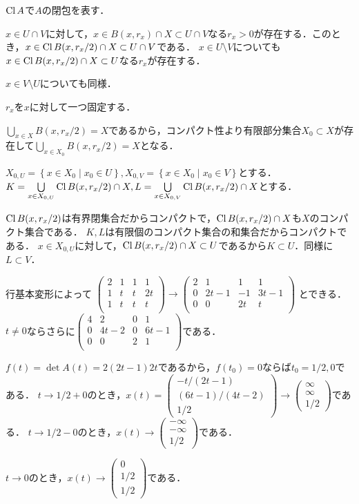 \documentclass[
		book,
		head_space=20mm,
		foot_space=20mm,
		gutter=10mm,
		line_length=190mm
]{jlreq}
\begin{document}
$\mathop{\mathrm{Cl}}{A}$で$A$の閉包を表す．

$x\in U\cap V$に対して，$x\in B(x,r_x)\cap X \subset U\cap V$なる$r_x>0$が存在する．このとき，$x\in \mathop{\mathrm{Cl}}{B(x,r_x/2)} \cap X \subset U\cap V$である．
$x\in U\setminus V$についても$x\in \mathop{\mathrm{Cl}}{B(x,r_x/2)} \cap X \subset U$なる$r_x$が存在する．

$x\in V \setminus U$についても同様．

$r_x$を$x$に対して一つ固定する．

$\bigcup\limits_{x\in X} B(x,r_x/2) =X$であるから，コンパクト性より有限部分集合$X_0\subset X$が存在して$\bigcup\limits_{x\in X_0} B(x,r_x/2) =X$となる．

$X_{0,U} = \left\{ x\in X_0 \mid x_0 \in U \right\},X_{0,V} = \left\{ x\in X_0 \mid x_0 \in V \right\}$とする．
$K=\bigcup\limits_{x\in X_{0,U}} \mathop{\mathrm{Cl}}{B(x,r_x/2)} \cap X,L=\bigcup\limits_{x\in X_{0,V}} \mathop{\mathrm{Cl}}{B(x,r_x/2)} \cap X$とする．

$\mathop{\mathrm{Cl}}{B(x,r_x/2)}$は有界閉集合だからコンパクトで，$\mathop{\mathrm{Cl}}{B(x,r_x/2)} \cap X$も$X$のコンパクト集合である．
$K,L$は有限個のコンパクト集合の和集合だからコンパクトである．
$x \in X_{0,U}$に対して，$\mathop{\mathrm{Cl}}{B(x,r_x/2)} \cap X \subset U$であるから$K\subset U$．同様に$L\subset V$．

行基本変形によって
$\begin{pmatrix}
    2 & 1 & 1  & 1 \\
    1 & t & t & 2t \\
    1 & t & t & t \\
\end{pmatrix}\rightarrow\begin{pmatrix}
    2 & 1 & 1  & 1 \\
    0 & 2t-1 & -1 & 3t-1 \\
    0 & 0 & 2t &  t\\
\end{pmatrix}$
とできる．
$t\neq0$ならさらに$\begin{pmatrix}
    4 & 2 & 0 & 1 \\
    0 & 4t-2 & 0 & 6t-1 \\
    0 & 0 & 2 &  1\\
\end{pmatrix}$である．

$f(t)=\det A(t)=2(2t-1)2t$であるから，$f(t_0)=0$ならば$t_0=1/2,0$である．
$t\to 1/2+0$のとき，$x(t)=\begin{pmatrix}
    -t/(2t-1) \\
    (6t-1)/(4t-2) \\
    1/2 
    \end{pmatrix}\rightarrow \begin{pmatrix}
        \infty \\
        \infty \\
        1/2
    \end{pmatrix}$である．
$t \to 1/2 -0$のとき，$x(t)\rightarrow \begin{pmatrix}
    -\infty \\
    -\infty \\
    1/2
\end{pmatrix}$である．

$t\rightarrow0$のとき，$x(t)\rightarrow \begin{pmatrix}
    0 \\
    1/2 \\
    1/2
\end{pmatrix}$である．
\end{document}
